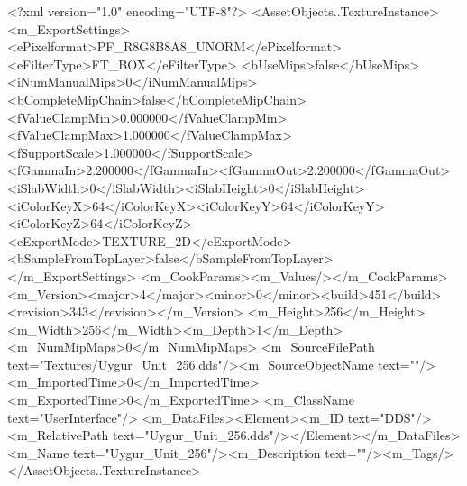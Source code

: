 <?xml version="1.0" encoding="UTF-8"?>
<AssetObjects..TextureInstance>
  <m_ExportSettings>
    <ePixelformat>PF_R8G8B8A8_UNORM</ePixelformat><eFilterType>FT_BOX</eFilterType>
    <bUseMips>false</bUseMips><iNumManualMips>0</iNumManualMips><bCompleteMipChain>false</bCompleteMipChain>
    <fValueClampMin>0.000000</fValueClampMin><fValueClampMax>1.000000</fValueClampMax><fSupportScale>1.000000</fSupportScale>
    <fGammaIn>2.200000</fGammaIn><fGammaOut>2.200000</fGammaOut><iSlabWidth>0</iSlabWidth><iSlabHeight>0</iSlabHeight>
    <iColorKeyX>64</iColorKeyX><iColorKeyY>64</iColorKeyY><iColorKeyZ>64</iColorKeyZ>
    <eExportMode>TEXTURE_2D</eExportMode><bSampleFromTopLayer>false</bSampleFromTopLayer>
  </m_ExportSettings>
  <m_CookParams><m_Values/></m_CookParams>
  <m_Version><major>4</major><minor>0</minor><build>451</build><revision>343</revision></m_Version>
  <m_Height>256</m_Height><m_Width>256</m_Width><m_Depth>1</m_Depth><m_NumMipMaps>0</m_NumMipMaps>
  <m_SourceFilePath text="Textures/Uygur_Unit_256.dds"/><m_SourceObjectName text=""/>
  <m_ImportedTime>0</m_ImportedTime><m_ExportedTime>0</m_ExportedTime>
  <m_ClassName text="UserInterface"/>
  <m_DataFiles><Element><m_ID text="DDS"/><m_RelativePath text="Uygur_Unit_256.dds"/></Element></m_DataFiles>
  <m_Name text="Uygur_Unit_256"/><m_Description text=""/><m_Tags/>
</AssetObjects..TextureInstance>
